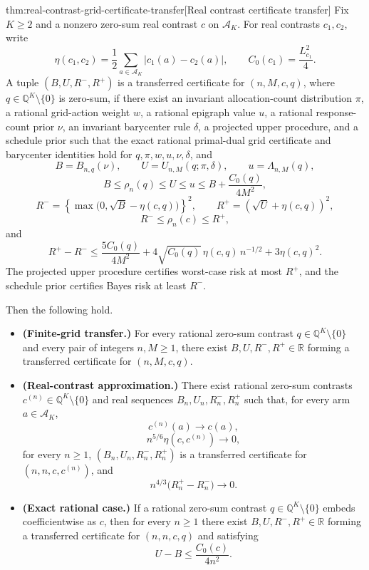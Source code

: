 \documentclass[11pt]{article}
\begin{document}
\begin{theoremv}{thm:real-contrast-grid-certificate-transfer}[Real contrast certificate transfer]
Fix \(K\ge 2\) and a nonzero zero-sum real contrast \(c\) on \(\mathcal A_K\).  For real contrasts \(c_1,c_2\), write
\[
\eta(c_1,c_2)=\frac12\sum_{a\in\mathcal A_K}|c_1(a)-c_2(a)|,
\qquad
C_0(c_1)=\frac{L_{c_1}^2}{4}.
\]
A tuple \((B,U,R^-,R^+)\) is a transferred certificate for \((n,M,c,q)\), where \(q\in\mathbb Q^K\setminus\{0\}\) is zero-sum, if there exist an invariant allocation-count distribution \(\pi\), a rational grid-action weight \(w\), a rational epigraph value \(u\), a rational response-count prior \(\nu\), an invariant barycenter rule \(\delta\), a projected upper procedure, and a schedule prior such that the exact rational primal-dual grid certificate and barycenter identities hold for \(q,\pi,w,u,\nu,\delta\), and
\[
B=B_{n,q}(\nu),\qquad
U=U_{n,M}(q;\pi,\delta),\qquad
u=\Lambda_{n,M}(q),
\]
\[
B\le \rho_n(q)\le U\le u
\le B+\frac{C_0(q)}{4M^2},
\]
\[
R^-=\left\{\max\bigl(0,\sqrt B-\eta(c,q)\bigr)\right\}^2,
\qquad
R^+=\left(\sqrt U+\eta(c,q)\right)^2,
\]
\[
R^-\le \rho_n(c)\le R^+,
\]
and
\[
R^+-R^-\le
\frac{5C_0(q)}{4M^2}
+4\sqrt{C_0(q)}\,\eta(c,q)\,n^{-1/2}
+3\eta(c,q)^2.
\]
The projected upper procedure certifies worst-case risk at most \(R^+\), and the schedule prior certifies Bayes risk at least \(R^-\).

Then the following hold.
\begin{itemize}
\item \textbf{(Finite-grid transfer.)} For every rational zero-sum contrast \(q\in\mathbb Q^K\setminus\{0\}\) and every pair of integers \(n,M\ge 1\), there exist \(B,U,R^-,R^+\in\mathbb R\) forming a transferred certificate for \((n,M,c,q)\).

\item \textbf{(Real-contrast approximation.)} There exist rational zero-sum contrasts \(c^{(n)}\in\mathbb Q^K\setminus\{0\}\) and real sequences \(B_n,U_n,R_n^-,R_n^+\) such that, for every arm \(a\in\mathcal A_K\),
\[
c^{(n)}(a)\longrightarrow c(a),
\]
\[
n^{5/6}\eta(c,c^{(n)})\longrightarrow 0,
\]
for every \(n\ge 1\), \((B_n,U_n,R_n^-,R_n^+)\) is a transferred certificate for \((n,n,c,c^{(n)})\), and
\[
n^{4/3}\bigl(R_n^+-R_n^-\bigr)\longrightarrow 0.
\]

\item \textbf{(Exact rational case.)} If a rational zero-sum contrast \(q\in\mathbb Q^K\setminus\{0\}\) embeds coefficientwise as \(c\), then for every \(n\ge 1\) there exist \(B,U,R^-,R^+\in\mathbb R\) forming a transferred certificate for \((n,n,c,q)\) and satisfying
\[
U-B\le \frac{C_0(c)}{4n^2}.
\]
\end{itemize}
\end{theoremv}
\end{document}
